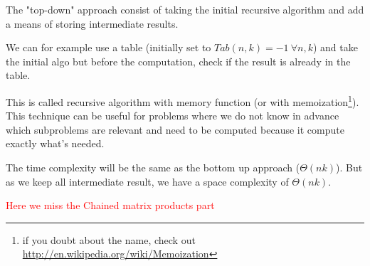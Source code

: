 The "top-down" approach consist of taking the initial recursive algorithm and add a means of storing intermediate results.

We can for example use a table (initially set to $Tab(n,k) = -1 \ \forall n,k$) and take the initial algo but before the computation, check if the result is already in the table. 

This is called recursive algorithm with memory function (or with memoization\footnote{if you doubt about the name, check out \url{http://en.wikipedia.org/wiki/Memoization}}). This technique can be useful for problems where we do not know in advance which subproblems are relevant and need to be computed because it compute exactly what's needed.

The time complexity will be the same as the bottom up approach ($\Theta (nk)$). But as we keep all intermediate result, we have a space complexity of $\Theta (nk)$. 


\textcolor{red}{Here we miss the Chained matrix products part}